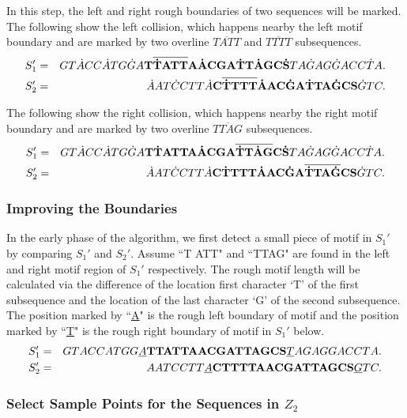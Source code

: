 \documentclass[11pt]{article}
\begin{document}
In this step, the left and right rough boundaries of two sequences will be marked.
The following show the left collision, which happens nearby the left
motif boundary and are marked by two overline $\overline{TATT}$ and
$\overline{TTTT}$ subsequences.
\begin{eqnarray*}
 S_1'&=&GT\dot{A}CC\dot{A}TG\dot{G}A{\Large\bf T\overline{\dot{T}ATT} A\dot{A}CGA\dot{T}T\dot{A}GC\dot{S}}TA\dot{G}AG\dot{G}ACC\dot{T}A.\\
S_2'&=&\dot{A}AT\dot{C}CTT\dot{A}{\Large\bf {\small
C}\overline{\dot{T}TTT}\dot{A}AC\dot{G}A\dot{T}TA\dot{G}CS}\dot{G}TC.
\end{eqnarray*}


The following show the right collision, which happens nearby the
right motif boundary and are marked by two overline
$\overline{TTAG}$ subsequences.
\begin{eqnarray*}
 S_1'&=&GT\dot{A}CC\dot{A}TG\dot{G}A{\Large\bf T\dot{T}ATT A\dot{A}CGA\overline{\dot{T}T\dot{A}G}C\dot{S}}TA\dot{G}AG\dot{G}ACC\dot{T}A.\\
S_2'&=&\dot{A}AT\dot{C}CTT\dot{A}{\Large\bf {\small
C}\dot{T}TTT\dot{A}AC\dot{G}A\overline{\dot{T}TA\dot{G}}CS}\dot{G}TC.
\end{eqnarray*}

\subsubsection{Improving the Boundaries}


In the early phase of the algorithm, we first detect a small piece
of motif in $S_1'$ by comparing $S_1'$ and $S_2'$. Assume ``T{\small
A}TT" and ``TTAG" are found in the left and right motif region of
$S_1'$ respectively. The rough motif length will be calculated via
the difference of the location first character `T' of the first
subsequence and the location of the last character `G' of the
second subsequence. The position marked by ``\underline{A}" is the
rough left boundary of motif and the position marked by
``\underline{T}" is the rough right boundary of motif in $S_1'$
below.
\begin{eqnarray*}
 S_1'&=&GTACCATGG\underline{A}{\Large\bf TTATTAACGATTAGCS}\underline{T}AGAGGACCTA.\\
S_2'&=&AATCCTT\underline{A}{\Large\bf {\small
C}TTTTAACGATTAGCS}\underline{G}TC.
\end{eqnarray*}

\subsubsection{Select Sample Points for the Sequences in $Z_2$}
\end{document}
